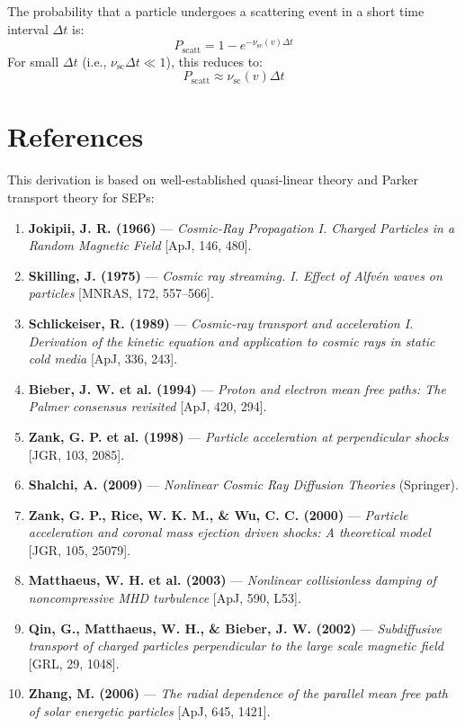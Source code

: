 The probability that a particle undergoes a scattering event in a short time interval $\Delta t$ is:
\begin{equation}
P_{\text{scatt}} = 1 - e^{-\nu_{\text{sc}}(v) \Delta t}
\tag{9}
\end{equation}
For small $\Delta t$ (i.e., $\nu_{\text{sc}} \Delta t \ll 1$), this reduces to:
\begin{equation}
P_{\text{scatt}} \approx \nu_{\text{sc}}(v) \Delta t
\tag{10}
\end{equation}

\hrulefill

\section*{\texorpdfstring{ \textbf{References}}{}}

This derivation is based on well-established quasi-linear theory and Parker transport theory for SEPs:
\begin{enumerate}
    \item \textbf{Jokipii, J. R. (1966)} --- \textit{Cosmic-Ray Propagation I. Charged Particles in a Random Magnetic Field} [ApJ, 146, 480].
    \item \textbf{Skilling, J. (1975)} --- \textit{Cosmic ray streaming. I. Effect of Alfvén waves on particles} [MNRAS, 172, 557--566].
    \item \textbf{Schlickeiser, R. (1989)} --- \textit{Cosmic-ray transport and acceleration I. Derivation of the kinetic equation and application to cosmic rays in static cold media} [ApJ, 336, 243].
    \item \textbf{Bieber, J. W. et al. (1994)} --- \textit{Proton and electron mean free paths: The Palmer consensus revisited} [ApJ, 420, 294].
    \item \textbf{Zank, G. P. et al. (1998)} --- \textit{Particle acceleration at perpendicular shocks} [JGR, 103, 2085].
    \item \textbf{Shalchi, A. (2009)} --- \textit{Nonlinear Cosmic Ray Diffusion Theories} (Springer).
    \item \textbf{Zank, G. P., Rice, W. K. M., \& Wu, C. C. (2000)} --- \textit{Particle acceleration and coronal mass ejection driven shocks: A theoretical model} [JGR, 105, 25079].
    \item \textbf{Matthaeus, W. H. et al. (2003)} --- \textit{Nonlinear collisionless damping of noncompressive MHD turbulence} [ApJ, 590, L53].
    \item \textbf{Qin, G., Matthaeus, W. H., \& Bieber, J. W. (2002)} --- \textit{Subdiffusive transport of charged particles perpendicular to the large scale magnetic field} [GRL, 29, 1048].
    \item \textbf{Zhang, M. (2006)} --- \textit{The radial dependence of the parallel mean free path of solar energetic particles} [ApJ, 645, 1421].
\end{enumerate}

